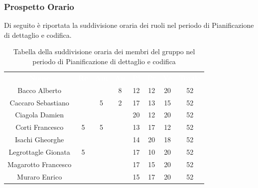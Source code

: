 \subsubsection{Prospetto Orario}
Di seguito è riportata la suddivisione oraria dei ruoli nel periodo di Pianificazione di dettaglio e codifica.




\begin{table}[H]	
	\begin{center}
	    \begin{tabular}{cccccccc}
			\rowcolor{greySWEight}
			\textcolor{white}{\textbf{Nome}} & \textcolor{white}{\textbf{Re}} & \textcolor{white}{\textbf{Am}} & \textcolor{white}{\textbf{An}} & \textcolor{white}{\textbf{Pj}} & \textcolor{white}{\textbf{Pr}} & \textcolor{white}{\textbf{Ve}} & \textcolor{white}{\textbf{Totale}}
			\\ 
			Bacco Alberto & & & 8 & 12 & 12 & 20 & 52 \\
			Caccaro Sebastiano & & 5 & 2 & 17 & 13 & 15 & 52 \\
			Ciagola Damien & & & & 20 & 12 & 20 & 52 \\
			Corti Francesco & 5 & 5 & & 13 & 17 & 12 & 52 \\
			Isachi Gheorghe & & & & 14 & 20 & 18 & 52 \\
			Legrottagle Gionata & 5 & & & 17 & 10 & 20 & 52 \\
			Magarotto Francesco & & & & 17 & 15 & 20 & 52 \\
			Muraro Enrico & & & & 15 & 17 & 20 & 52 \\
			\end{tabular}
	    \caption{Tabella della suddivisione oraria dei membri del gruppo nel periodo di Pianificazione di dettaglio e codifica} \label{tab:tabellaPersonePianificazione di dettaglio e codifica} 
	\end{center}
\end{table}


